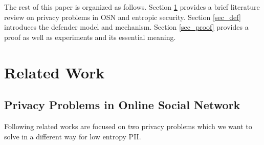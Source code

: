 \documentclass[10pt, conference, compsocconf]{IEEEtran}
\begin{document}

    The rest of this paper is organized as follows.
    Section \ref{sec_rw} provides a brief literature review on privacy problems in OSN and
    entropic security. Section \ref{sec_def} introduces the defender model and mechanism.
    Section \ref{sec_proof} provides a proof as well as experiments and its essential meaning.




\section{Related Work}  \label{sec_rw}
    \subsection{Privacy Problems in Online Social Network}
    Following related works are focused on two privacy problems
    which we want to solve in a different way for low entropy PII.
\end{document}
